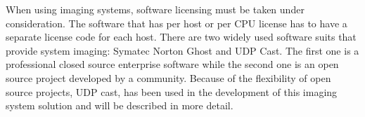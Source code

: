 When using imaging systems, software licensing must be taken under
consideration.  The software that has per host or per CPU license has
to have a separate license code for each host.
There are two widely used software suits that provide system imaging:
Symatec Norton Ghost and UDP Cast. The first one is a professional
closed source enterprise software while the second one is an open
source project developed by a community.  Because of the flexibility
of open source projects, UDP cast, has been used in the development of
this imaging system solution and will be described in more detail.


